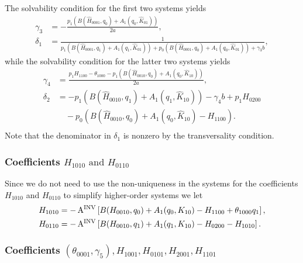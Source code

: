 The solvability condition for the first two systems yields
\begin{equation*}
\begin{aligned}
\gamma_3 &= -\frac{p_1 \left( 
				B(\hat H_{0001},q_0)+A_1(q_0,\hat K_{01}) \right)}{2a}, \\
\delta_1 &= \frac{1}{p_1 \left(
			B(\hat H_{0001},q_1)+A_1(q_1,\hat K_{01}) \right) + p_0
      \left( B(\hat H_{0001},q_0)+A_1(q_0,\hat K_{01}) \right) + \gamma_3 b},
\end{aligned}
\end{equation*}
while the solvability condition for the latter two systems yields
\begin{equation*}
\begin{aligned}
\gamma_4 &= \frac{p_1H_{1100} - \theta_{1000} - p_1 \left( B(\hat
				H_{0010},q_0)+A_1(q_0,\hat K_{10})\right)}{2a} ,\\
\delta_2 &= -p_1 \left( B(\hat H_{0010},q_1) + A_1(q_1,\hat K_{10}) \right)
				- \gamma_4 b + p_1 H_{0200} \\
	& \quad - p_0 \left( B(\hat H_{0010},q_0)+A_1(q_0,\hat K_{10})-H_{1100}
	\right). \\
\end{aligned}
\end{equation*}
Note that the denominator in $\delta_1$ is nonzero by the transversality
condition.


\subsubsection{Coefficients \texorpdfstring{$H_{1010} \text{ and }
								H_{0110}$}{H1010 and H0110}}

Since we do not need to use the non-uniqueness in the systems for the
coefficients $H_{1010}$ and $H_{0110}$ to simplify higher-order systems we
let
\begin{equation*}
\begin{aligned}
H_{1010} &= -\operatorname{A^{\text{INV}}} \left[ B(H_{0010},q_0)+A_1(q_0,K_{10})-H_{1100}
								+\theta_{1000}q_1 \right],\\
H_{0110} &= -\operatorname{A^{\text{INV}}} \left[B(H_{0010},q_1)+A_1(q_1,K_{10})-H_{0200}-H_{1010}
\right].
\end{aligned}
\end{equation*}

\subsubsection{Coefficients \texorpdfstring{$(\theta_{0001},\gamma_5),H_{1001},
H_{0101}, H_{2001}, H_{1101}$}{(theta0001,gamma5),H1001,H0101,H2001,H1101}}

